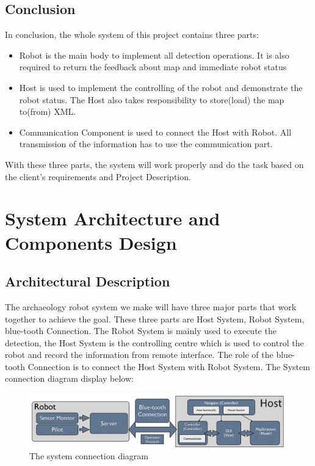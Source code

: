\documentclass[11pt, a4paper]{report}
\begin{document}
\pagebreak
\section{Conclusion}
In conclusion, the whole system of this project contains three parts:
\begin{itemize}
  \item Robot is the main body to implement all detection operations. It is also required to return the feedback about map and immediate robot status 
  \item Host is used to implement the controlling of the robot and demonstrate the robot status. The Host also takes responsibility to store(load) the map to(from) XML. 
  \item Communication Component is used to connect the Host with Robot. All transmission of the information has to use the communication part. 
\end{itemize}
With these three parts, the system will work properly and do the task based on the client's requirements and Project Description.



\pagebreak


\chapter{System Architecture and Components Design}%
\label{cha:SACD}


\section{Architectural Description}
The archaeology robot system we make will have three major parts that work together to achieve the goal. These three parts are Host System, Robot System, blue-tooth Connection. The Robot System is mainly used to execute the detection, the Host System is the controlling centre which is used to control the robot and record the information from remote interface. The role of the blue-tooth Connection is to connect the Host System with Robot System. The System connection diagram display below: 
\begin{figure}[h]
  \centering
    \includegraphics[width=16cm]{System.png}
  \caption{The system connection diagram}
\end{figure}
\end{document}
